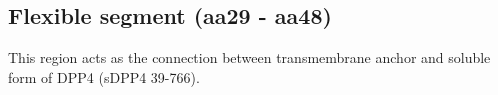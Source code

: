 \subsection{Flexible segment (aa29 - aa48)}

This region acts as the connection between transmembrane anchor and soluble form of DPP4 (sDPP4 39-766). 
